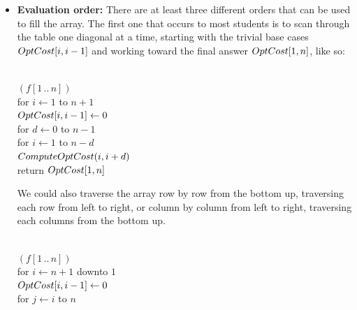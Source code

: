\begin{itemize}
The following subroutine fills the entry $\Var{OptCost}[i, k]$, assuming all the entries it depends on have already been computed.
\begin{pseudocode}
\\
$\Var{OptCost}[i, k] \gets \infty$\\
for $r \gets i$ to $k$\\
\Indent $\Var{tmp} \gets \Var{OptCost}[i, r-1] + \Var{OptCost}[r+1, k]$\\
\Indent if $\Var{OptCost}[i, k] > \Var{tmp}$\\
\Indent\Indent $\Var{OptCost}[i, k] \gets \Var{tmp}$\\
$\Var{OptCost}[i, k] \gets \Var{OptCost}[i, k] + F[i, k]$
\end{pseudocode}
\item \textbf{Evaluation order:} There are at least three different orders that can be used to fill the array.
The first one that occurs to most students is to scan through the table one diagonal at a time, starting with the trivial base cases $OptCost[i, i-1]$ and working toward the final answer $OptCost[1, n]$, like so:
\begin{pseudocode}
\\
$(f[1\,..\,n])$\\
for $i \gets 1$ to $n+1$\\
\Indent $OptCost[i, i-1] \gets 0$\\
for $d \gets 0$ to $n-1$\\
\Indent for $i \gets 1$ to $n-d$ \\
\Indent\Indent $ComputeOptCost(i, i+d)$\\
return $OptCost[1, n]$
\end{pseudocode}
We could also traverse the array row by row from the bottom up, traversing each row from left to right, or column by column from left to right, traversing each columns from the bottom up.
\begin{center}
\begin{minipage}[c]{0.48\linewidth}
\begin{pseudocode}
\\
$(f[1\,..\,n])$\\
for $i \gets n+1$ downto $1$\\
\Indent $OptCost[i, i-1] \gets 0$\\
\Indent for $j \gets i$ to $n$\\

\end{pseudocode}
\end{minipage}
\end{center}
\end{itemize}
